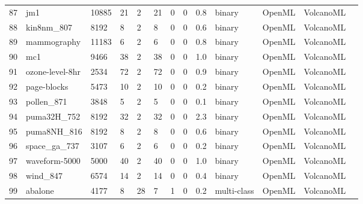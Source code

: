 \begin{table*}
\begin{tabular}{lllllllllllll}
87  & jm1                                         & 10885   & 21     & 2     & 21    & 0      & 0         & 0.8       & binary      & OpenML & VolcanoML        \\
88  & kin8nm\_807                                 & 8192    & 8      & 2     & 8     & 0      & 0         & 0.6       & binary      & OpenML & VolcanoML        \\
89  & mammography                                 & 11183   & 6      & 2     & 6     & 0      & 0         & 0.8       & binary      & OpenML & VolcanoML        \\
90  & mc1                                         & 9466    & 38     & 2     & 38    & 0      & 0         & 1.0       & binary      & OpenML & VolcanoML        \\
91  & ozone-level-8hr                             & 2534    & 72     & 2     & 72    & 0      & 0         & 0.9       & binary      & OpenML & VolcanoML        \\
92  & page-blocks                                 & 5473    & 10     & 2     & 10    & 0      & 0         & 0.2       & binary      & OpenML & VolcanoML        \\
93  & pollen\_871                                 & 3848    & 5      & 2     & 5     & 0      & 0         & 0.1       & binary      & OpenML & VolcanoML        \\
94  & puma32H\_752                                & 8192    & 32     & 2     & 32    & 0      & 0         & 2.3       & binary      & OpenML & VolcanoML        \\
95  & puma8NH\_816                                & 8192    & 8      & 2     & 8     & 0      & 0         & 0.6       & binary      & OpenML & VolcanoML        \\
96  & space\_ga\_737                              & 3107    & 6      & 2     & 6     & 0      & 0         & 0.2       & binary      & OpenML & VolcanoML        \\
97  & waveform-5000                               & 5000    & 40     & 2     & 40    & 0      & 0         & 1.0       & binary      & OpenML & VolcanoML        \\
98  & wind\_847                                   & 6574    & 14     & 2     & 14    & 0      & 0         & 0.4       & binary      & OpenML & VolcanoML        \\
99  & abalone                                     & 4177    & 8      & 28    & 7     & 1      & 0         & 0.2       & multi-class & OpenML & VolcanoML        \\

\end{tabular}
\end{table*}
